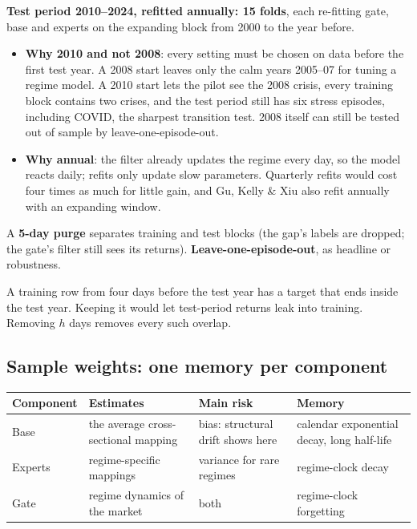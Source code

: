  \textbf{Test period 2010--2024, refitted annually: 15 folds}, each re-fitting gate, base
and experts on the expanding block from 2000 to the year before.

\begin{whybox}
\begin{itemize}
\item \textbf{Why 2010 and not 2008}: every setting must be chosen on data before the first test year. A 2008
  start leaves only the calm years 2005--07 for tuning a regime model. A 2010 start lets the pilot see the
  2008 crisis, every training block contains two crises, and the test period still has six stress
  episodes, including COVID, the sharpest transition test. 2008 itself can still be tested out of sample
  by leave-one-episode-out.
\item \textbf{Why annual}: the filter already updates the regime every day, so the model reacts daily;
  refits only update slow parameters. Quarterly refits would cost four times as much for little gain, and
  Gu, Kelly \& Xiu also refit annually with an expanding window.
\end{itemize}
\end{whybox}

A \textbf{5-day purge} separates training and test blocks (the gap's labels are dropped; the gate's filter
still sees its returns).  \textbf{Leave-one-episode-out}, as headline or robustness.

\begin{whybox}
A training row from four days before the test year has a target that ends inside the test year. Keeping it
would let test-period returns leak into training. Removing $h$ days removes every such overlap.
\end{whybox}

\subsection{Sample weights: one memory per component}
\label{sec:weights}


{\small
\begin{tabularx}{\textwidth}{@{}l X X X@{}}
\toprule
Component & Estimates & Main risk & Memory\\
\midrule
Base & the average cross-sectional mapping & bias: structural drift shows here & calendar exponential
decay, long half-life\\
Experts & regime-specific mappings & variance for rare regimes & regime-clock decay\\
Gate & regime dynamics of the market & both & regime-clock forgetting\\
\bottomrule
\end{tabularx}}

